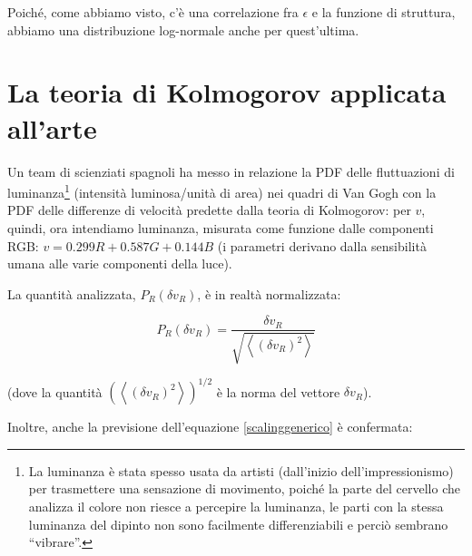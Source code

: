 \documentclass[12pt,a4paper]{article}
\numberwithin{equation}{section}
\begin{document}
Poiché, come abbiamo visto, c'è una correlazione fra $\epsilon$ e la funzione di struttura, abbiamo una distribuzione log-normale anche per quest'ultima.

\section{La teoria di Kolmogorov applicata all'arte}

Un team di scienziati spagnoli \cite{study2006} ha messo in relazione la PDF delle fluttuazioni di luminanza\footnote{La luminanza è stata spesso usata da artisti (dall'inizio dell'impressionismo) per trasmettere una sensazione di movimento, poiché la parte del cervello che analizza il colore non riesce a percepire la luminanza, le parti con la stessa luminanza del dipinto non sono facilmente differenziabili e perciò sembrano ``vibrare''.} (intensità luminosa/unità di area) nei quadri di Van Gogh con la PDF delle differenze di velocità predette dalla teoria di Kolmogorov: per $v$, quindi, ora intendiamo luminanza, misurata come funzione dalle componenti RGB: $v = 0.299 R + 0.587 G + 0.144B$ (i parametri derivano dalla sensibilità umana alle varie componenti della luce).

La quantità analizzata, $P_R(\delta v_R)$, è in realtà normalizzata:

\begin{equation}
P_R(\delta v_R)=
\frac{\delta v_R}{\sqrt{\left\langle
(\delta v_R )^2
\right\rangle}}
\end{equation}

(dove la quantità $\left(\left\langle
(\delta v_R )^2
\right\rangle\right)^{1/2}$ è la norma del vettore $\delta v_R$).

Inoltre, anche la previsione dell'equazione \ref{scalinggenerico} è confermata: 

\tableofcontents
\end{document}
